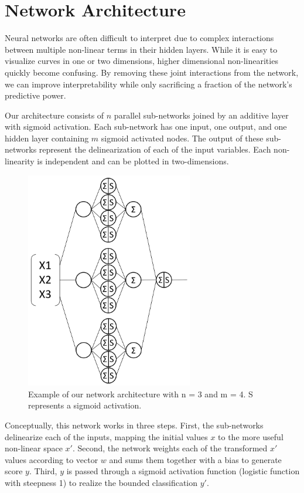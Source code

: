 
\section{Network Architecture}

Neural networks are often difficult to interpret due to complex interactions between multiple non-linear terms in their hidden layers. While it is easy to visualize curves in one or two dimensions, higher dimensional non-linearities quickly become confusing. By removing these joint interactions from the network, we can improve interpretability while only sacrificing a fraction of the network’s predictive power.

Our architecture consists of $n$ parallel sub-networks joined by an additive layer with sigmoid activation. Each sub-network has one input, one output, and one hidden layer containing $m$ sigmoid activated nodes. The output of these sub-networks represent the delinearization of each of the input variables. Each non-linearity is independent and can be plotted in two-dimensions.

\begin{figure}
    \centering
    \includegraphics[width=0.65\textwidth]{fig/mnn}
    \caption{Example of our network architecture with n = 3 and m = 4. S represents a sigmoid activation.}
\end{figure}

Conceptually, this network works in three steps. First, the sub-networks delinearize each of the inputs, mapping the initial values $x$ to the more useful non-linear space $x'$. Second, the network weights each of the transformed $x'$ values according to vector $w$ and sums them together with a bias to generate score $y$. Third, $y$ is passed through a sigmoid activation function (logistic function with steepness 1) to realize the bounded classification $y'$. 

